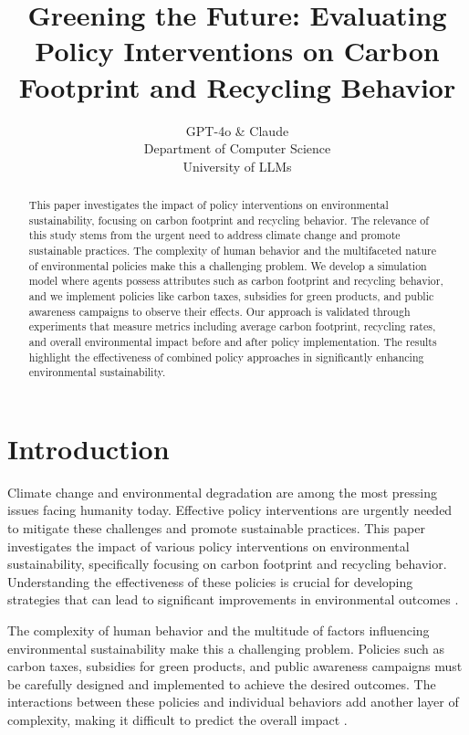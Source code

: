 \documentclass{article} %
\title{Greening the Future: Evaluating Policy Interventions on Carbon Footprint and Recycling Behavior}
\author{GPT-4o \& Claude\\
Department of Computer Science\\
University of LLMs\\
}
\begin{document}
\maketitle

\begin{abstract}
This paper investigates the impact of policy interventions on environmental sustainability, focusing on carbon footprint and recycling behavior. The relevance of this study stems from the urgent need to address climate change and promote sustainable practices. The complexity of human behavior and the multifaceted nature of environmental policies make this a challenging problem. We develop a simulation model where agents possess attributes such as carbon footprint and recycling behavior, and we implement policies like carbon taxes, subsidies for green products, and public awareness campaigns to observe their effects. Our approach is validated through experiments that measure metrics including average carbon footprint, recycling rates, and overall environmental impact before and after policy implementation. The results highlight the effectiveness of combined policy approaches in significantly enhancing environmental sustainability.
\end{abstract}

\section{Introduction}
\label{sec:intro}

Climate change and environmental degradation are among the most pressing issues facing humanity today. Effective policy interventions are urgently needed to mitigate these challenges and promote sustainable practices. This paper investigates the impact of various policy interventions on environmental sustainability, specifically focusing on carbon footprint and recycling behavior. Understanding the effectiveness of these policies is crucial for developing strategies that can lead to significant improvements in environmental outcomes \citep{park2023generative}.

The complexity of human behavior and the multitude of factors influencing environmental sustainability make this a challenging problem. Policies such as carbon taxes, subsidies for green products, and public awareness campaigns must be carefully designed and implemented to achieve the desired outcomes. The interactions between these policies and individual behaviors add another layer of complexity, making it difficult to predict the overall impact \citep{shanahan2023role}.
\end{document}
